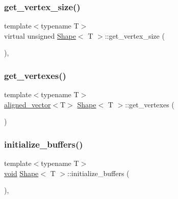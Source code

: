 \mbox{\label{classShape_a58713d8cf7c4175e7c76eae75c94bc13}} 
\subsubsection{\texorpdfstring{get\+\_\+vertex\+\_\+size()}{get\_vertex\_size()}}
{\footnotesize\ttfamily template$<$typename T$>$ \\
virtual unsigned \mbox{\hyperlink{classShape}{Shape}}$<$ T $>$\+::get\+\_\+vertex\+\_\+size (\begin{DoxyParamCaption}{ }\end{DoxyParamCaption})\hspace{0.3cm}{\ttfamily [inline]}, {\ttfamily [virtual]}}

\mbox{\label{classShape_a3729bbdd0c4e4f3379498734807bb545}} 
\subsubsection{\texorpdfstring{get\+\_\+vertexes()}{get\_vertexes()}}
{\footnotesize\ttfamily template$<$typename T$>$ \\
\mbox{\hyperlink{type__definitions_8hpp_a087efd587d66b881646ef378f1919c90}{aligned\+\_\+vector}}$<$T$>$ \mbox{\hyperlink{classShape}{Shape}}$<$ T $>$\+::get\+\_\+vertexes (\begin{DoxyParamCaption}{ }\end{DoxyParamCaption})\hspace{0.3cm}{\ttfamily [inline]}}

\mbox{\label{classShape_a8b4f54a694871f9d131fdd105e1ca709}} 
\subsubsection{\texorpdfstring{initialize\+\_\+buffers()}{initialize\_buffers()}}
{\footnotesize\ttfamily template$<$typename T$>$ \\
\mbox{\hyperlink{glad_8h_a950fc91edb4504f62f1c577bf4727c29}{void}} \mbox{\hyperlink{classShape}{Shape}}$<$ T $>$\+::initialize\+\_\+buffers (\begin{DoxyParamCaption}{ }\end{DoxyParamCaption})\hspace{0.3cm}{\ttfamily [inline]}, {\ttfamily [protected]}}



